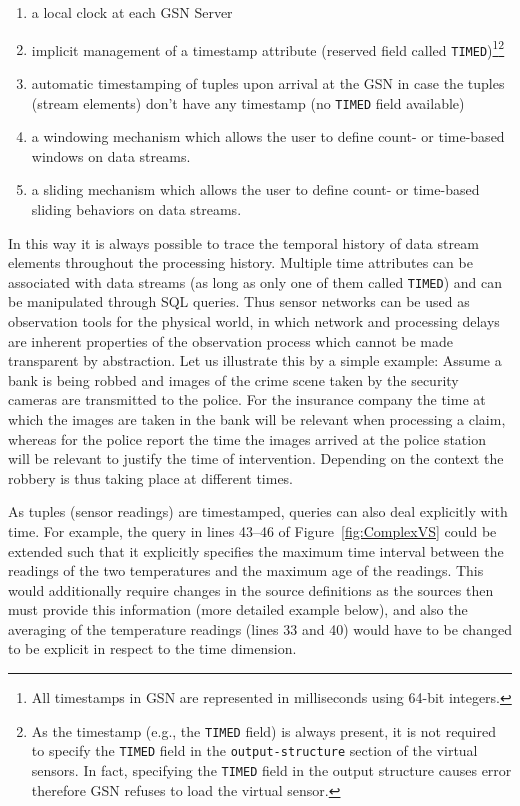 \begin{enumerate}
\item a local clock at each GSN Server
\item implicit management of a timestamp attribute (reserved field called \texttt{TIMED})\footnote{All timestamps in GSN are represented in milliseconds using 64-bit integers.}\footnote{As the timestamp (e.g., the \texttt{TIMED} field) is always present, it is not required to specify the \texttt{TIMED} field in the  \texttt{output-structure} section of the virtual sensors. In fact, specifying the \texttt{TIMED} field in the output structure causes error therefore GSN refuses to load the virtual sensor.}
\item automatic timestamping of tuples upon arrival at the GSN in case the tuples (stream elements) don't have
any timestamp (no \texttt{TIMED} field available)
\item a windowing mechanism which allows the user to define count- or
  time-based windows on data streams.
\item a sliding mechanism which allows the user to define count- or  time-based sliding behaviors on data streams.
\end{enumerate}

In this way it is always possible to trace the temporal history of
data stream elements throughout the processing history.  Multiple time
attributes can be associated with data streams (as long as only one of them called \texttt{TIMED})
and can be manipulated through SQL queries. Thus sensor networks can be used as observation
tools for the physical world, in which network and processing delays
are inherent properties of the observation process which cannot be
made transparent by abstraction.  Let us illustrate this by a simple
example: Assume a bank is being robbed and images of the crime scene
taken by the security cameras are transmitted to the police. For the
insurance company the time at which the images are taken in the bank
will be relevant when processing a claim, whereas for the police
report the time the images arrived at the police station will be
relevant to justify the time of intervention. Depending on the context
the robbery is thus taking place at different times.

As tuples (sensor readings) are timestamped, queries can also deal
explicitly with time. For example, the query in lines 43--46 of
Figure~\ref{fig:ComplexVS} could be extended such that it explicitly
specifies the maximum time interval between the readings of the two
temperatures and the maximum age of the readings. This would
additionally require changes in the source definitions as the
sources then must provide this information (more detailed example below), and also the
averaging of the temperature readings (lines 33 and 40) would have to
be changed to be explicit in respect to the time dimension.

